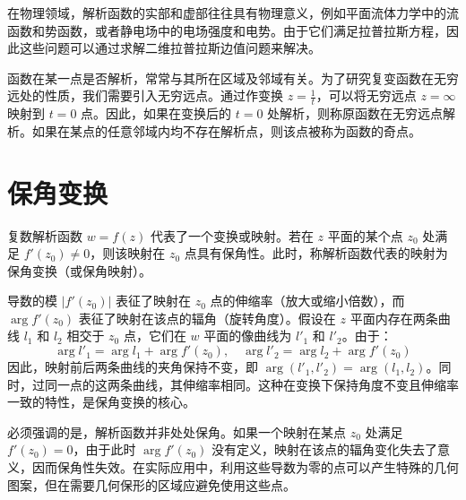\begin{remark}
在物理领域，解析函数的实部和虚部往往具有物理意义，例如平面流体力学中的流函数和势函数，或者静电场中的电场强度和电势。由于它们满足拉普拉斯方程，因此这些问题可以通过求解二维拉普拉斯边值问题来解决。
\end{remark}

\begin{remark}[无穷远点处的解析性]
函数在某一点是否解析，常常与其所在区域及邻域有关。为了研究复变函数在无穷远处的性质，我们需要引入无穷远点。通过作变换 \(z = \frac{1}{t}\)，可以将无穷远点 \(z = \infty\) 映射到 \(t = 0\) 点。因此，如果在变换后的 \(t = 0\) 处解析，则称原函数在无穷远点解析。如果在某点的任意邻域内均不存在解析点，则该点被称为函数的奇点。
\end{remark}

\section{保角变换}

\begin{definition}[保角变换]
复数解析函数 \(w = f(z)\) 代表了一个变换或映射。若在 \(z\) 平面的某个点 \(z_0\) 处满足 \(f'(z_0) \neq 0\)，则该映射在 \(z_0\) 点具有保角性。此时，称解析函数代表的映射为保角变换（或保角映射）。
\end{definition}

\begin{remark}[几何直观解释]
导数的模 \(|f'(z_0)|\) 表征了映射在 \(z_0\) 点的伸缩率（放大或缩小倍数），而 \(\arg f'(z_0)\) 表征了映射在该点的辐角（旋转角度）。假设在 \(z\) 平面内存在两条曲线 \(l_1\) 和 \(l_2\) 相交于 \(z_0\) 点，它们在 \(w\) 平面的像曲线为 \(l'_1\) 和 \(l'_2\)。由于：
\begin{equation*}
\arg l'_1 = \arg l_1 + \arg f'(z_0), \quad \arg l'_2 = \arg l_2 + \arg f'(z_0)
\end{equation*}
因此，映射前后两条曲线的夹角保持不变，即 \(\arg(l'_1, l'_2) = \arg(l_1, l_2)\)。同时，过同一点的这两条曲线，其伸缩率相同。这种在变换下保持角度不变且伸缩率一致的特性，是保角变换的核心。
\end{remark}

\begin{remark}[非保角的特殊点]
必须强调的是，解析函数并非处处保角。如果一个映射在某点 \(z_0\) 处满足 \(f'(z_0) = 0\)，由于此时 \(\arg f'(z_0)\) 没有定义，映射在该点的辐角变化失去了意义，因而保角性失效。在实际应用中，利用这些导数为零的点可以产生特殊的几何图案，但在需要几何保形的区域应避免使用这些点。
\end{remark}

